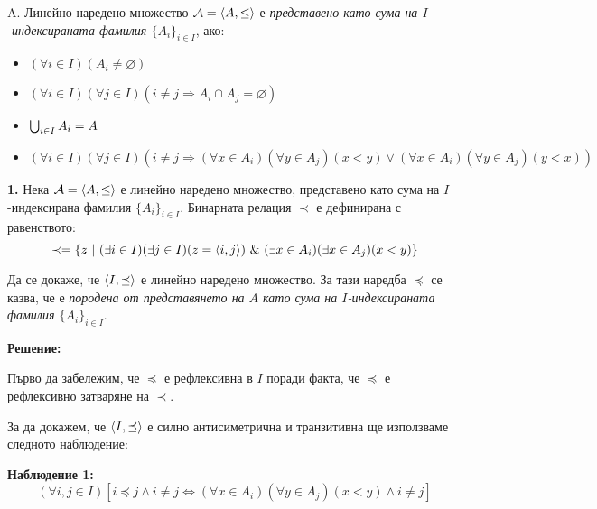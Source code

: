 \begin{problem}
A. Линейно наредено множество $\mathcal{A} = \langle A, \le \rangle$ е
\textit{представено като сума на $I$-индексираната фамилия $\{A_i\}_{i \in I}$}, ако:
\begin{itemize}
\item
$(\forall i \in I)(A_i \neq \varnothing)$
\item
$(\forall i \in I)(\forall j \in I)(i \neq j \Rightarrow A_i \cap A_j = \varnothing)$
\item
$\bigcup_{i \in I} A_i = A$
\item
$(\forall i \in I)(\forall j \in I)(i \neq j \Rightarrow (\forall x \in A_i)(\forall y \in A_j)(x < y) \lor (\forall x \in A_i)(\forall y \in A_j)(y < x))$
\end{itemize}

\quad
\textbf{1.}
Нека $\mathcal{A} = \langle A, \leq \rangle$ е линейно наредено множество,
представено като сума на $I$-индексирана фамилия $\{A_i\}_{i \in I}$.
Бинарната релация $\prec$ е дефинирана с равенството:
\[
\prec = \{z\ |\ (\exists i \in I)(\exists j \in I)(z = \pair{i, j}) \land (\exists x \in A_i)(\exists x \in A_j)(x < y)\}
\]

\quad
Да се докаже, че $\langle I, \preceq \rangle$ е линейно наредено множество.
За тази наредба $\preceq$ се казва, че е \textit{породена от представянето на $A$ като сума на
$I$-индексираната фамилия $\{A_i\}_{i \in I}$}.

\bigbreak
\textbf{Решение:}

\smallbreak
\quad
Първо да забележим, че $\preceq$ е рефлексивна в $I$ поради факта, че $\preceq$ е рефлексивно затваряне на $\prec$.

\quad
За да докажем, че $\langle I, \preceq \rangle$ е силно антисиметрична и транзитивна ще използваме следното наблюдение:

\smallbreak
\quad
\textbf{Наблюдение 1:}
\[
	(\forall i, j \in I) [i \preceq j \land i \neq j \iff (\forall x \in A_i)(\forall y \in A_j)(x < y) \land i \neq j]
\]

\begin{tcolorbox}[mybox, title={Доказателство:}]


\end{tcolorbox}
\end{problem}
